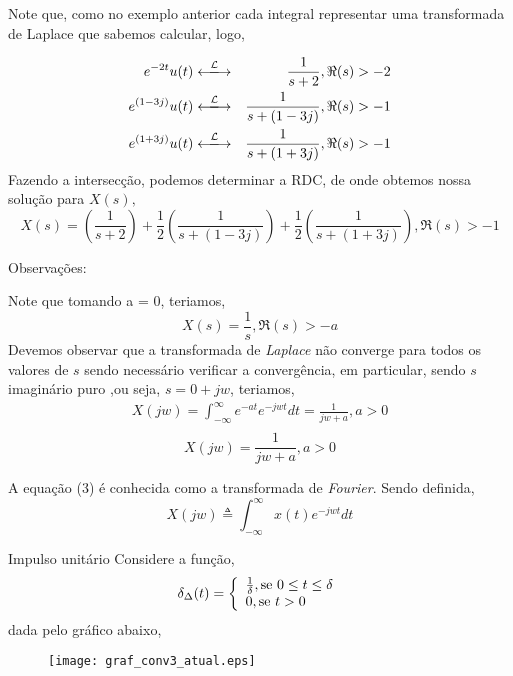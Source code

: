 \documentclass[9pt]{beamer}
\begin{document}
 \begin{frame}
   \justifying
   Note que, como no exemplo anterior cada integral representar  uma transformada de Laplace que sabemos calcular, logo,
   \par
   \begin{eqnarray}
     e^{-2t} u(t) & \xlongleftrightarrow{\mathcal{L}} & \frac {1} {s + 2}, \Re(s) > -2 \nonumber \\
     e^{(1-3j)} u(t) & \xlongleftrightarrow{\mathcal{L}} & \frac {1} {s + (1 -3j)}, \Re(s) > - 1 \nonumber \\
     e^{(1+3j)} u(t) & \xlongleftrightarrow{\mathcal{L}} & \frac {1} {s + (1 + 3j)}, \Re(s) > -1 \nonumber 
   \end{eqnarray}
   Fazendo  a intersec\c{c}\~{a}o, podemos determinar a RDC, de onde  obtemos nossa solu\c{c}\~{a}o para $X(s), $
   $$ X(s) \equal \left (\frac {1} {s + 2} \right) +  \frac {1} {2} \left(\frac {1} {s + (1 -3j)} \right) +  \frac {1} {2} \left (\frac {1} {s + (1 + 3j)} \right) , \Re(s) > -1$$ 
\end{frame}
\begin{frame}
  \justifying
  Observa\c{c}\~{o}es:
  \par
   Note que tomando  a = 0, teriamos,
   $$ X(s) = \frac {1} {s},\Re(s) > -a $$
   Devemos observar que a transformada de \textit{Laplace} n\~{a}o converge para todos os valores de $s$ sendo necess\'{a}rio verificar a converg\^{e}ncia, em particular, sendo $s$ imagin\'{a}rio puro
   ,ou seja, $ s = 0 + jw $, 
	teriamos,
	\begin{eqnarray}
	   X (jw) = \int_{-\infty}^{\infty} e^{-at} e^{-jwt} dt = \frac {1} { jw + a}, a > 0 \nonumber \\
	\end{eqnarray}
	$$X(jw) = \frac {1} { jw + a }, a > 0$$
	\par
	A equa\c{c}\~{a}o  (3) \'{e} conhecida como  a transformada de \textit{Fourier}. Sendo definida,
	$$ X(jw) \triangleq \int_{-\infty}^{\infty} x(t)e^{-jwt} dt $$ 
\end{frame}
\begin{frame}{ Impulso unit\'{a}rio}
  Considere a fun\c{c}\~{a}o,
  \begin{displaymath}
    \delta_\Delta (t) = \left \{\begin{array}{ll}
      \frac {1} {\delta}, \textrm {se $ 0 \leq  t \leq \delta $} \\
      0, \textrm {se $ t > 0 $}
    \end{array} \right.
  \end{displaymath}
  \newline
  dada pelo gr\'{a}fico abaixo,
  \newline
  \begin{figure}[!htb]
    \texttt{[image: graf\_conv3\_atual.eps]}
  \end{figure}
  \par
\end{frame}
\end{document}
